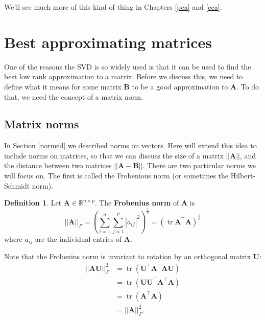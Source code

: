 \documentclass[]{book}
\theoremstyle{definition}
\newtheorem{definition}{Definition}[chapter]
\theoremstyle{definition}
\theoremstyle{definition}
\theoremstyle{remark}
\begin{document}
We'll see much more of this kind of thing in Chapters \ref{pca} and \ref{cca}.

\hypertarget{best-approximating-matrices}{%
\section{Best approximating matrices}\label{best-approximating-matrices}}

One of the reasons the SVD is so widely used is that it can be used to find the best low rank approximation to a matrix. Before we discuss this, we need to define what it means for some matrix \(\boldsymbol B\) to be a good approximation to \(\boldsymbol A\). To do that, we need the concept of a matrix norm.

\hypertarget{matrix-norms}{%
\subsection{Matrix norms}\label{matrix-norms}}

In Section \ref{normed} we described norms on vectors. Here will extend this idea to include norms on matrices, so that we can discuss the size of a matrix \(||\boldsymbol A||\), and the distance between two matrices \(||\boldsymbol A-\boldsymbol B||\). There are two particular norms we will focus on. The first is called the Frobenious norm (or sometimes the Hilbert-Schmidt norm).

\begin{definition}
\protect\hypertarget{def:frobenius}{}{\label{def:frobenius} }Let \(\boldsymbol A\in \mathbb{R}^{n\times p}\). The \textbf{Frobenius norm} of \(\boldsymbol A\) is
\[||\boldsymbol A||_F = \left(\sum_{i=1}^n\sum_{j=1}^p |a_{ij}|^2\right)^{\frac{1}{2}}=(\operatorname{tr}\boldsymbol A^\top\boldsymbol A)^{\frac{1}{2}}  
\]
where \(a_{ij}\) are the individual entries of \(\boldsymbol A\).
\end{definition}

Note that the Frobenius norm is invariant to rotation by an orthogonal matrix \(\boldsymbol U\):
\begin{align*}
 ||\boldsymbol A\boldsymbol U||_F^2 &= \operatorname{tr}(\boldsymbol U^\top \boldsymbol A^\top \boldsymbol A\boldsymbol U)\\
 &=\operatorname{tr}(\boldsymbol U\boldsymbol U^\top \boldsymbol A^\top \boldsymbol A)\\
 &= \operatorname{tr}(\boldsymbol A^\top\boldsymbol A)\\
 &= ||\boldsymbol A||_F^2.
\end{align*}
\end{document}
